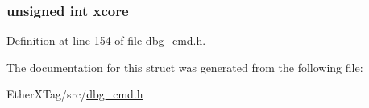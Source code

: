 \hypertarget{structdbg__cmd__type__continue_a78357326dd562d441c3c73f5676ac638}{
\subsubsection[{xcore}]{\setlength{\rightskip}{0pt plus 5cm}unsigned int xcore}}\label{structdbg__cmd__type__continue_a78357326dd562d441c3c73f5676ac638}


Definition at line 154 of file dbg\-\_\-cmd.\-h.



The documentation for this struct was generated from the following file\-:\begin{DoxyCompactItemize}
\item 
Ether\-X\-Tag/src/\hyperlink{dbg__cmd_8h}{dbg\-\_\-cmd.\-h}\end{DoxyCompactItemize}
